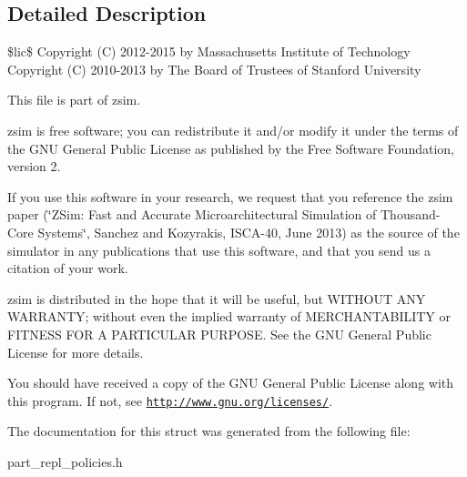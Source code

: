 \subsection{Detailed Description}
\$lic\$ Copyright (C) 2012-\/2015 by Massachusetts Institute of Technology Copyright (C) 2010-\/2013 by The Board of Trustees of Stanford University

This file is part of zsim.

zsim is free software; you can redistribute it and/or modify it under the terms of the G\-N\-U General Public License as published by the Free Software Foundation, version 2.

If you use this software in your research, we request that you reference the zsim paper (\char`\"{}\-Z\-Sim\-: Fast and Accurate Microarchitectural Simulation of
\-Thousand-\/\-Core Systems\char`\"{}, Sanchez and Kozyrakis, I\-S\-C\-A-\/40, June 2013) as the source of the simulator in any publications that use this software, and that you send us a citation of your work.

zsim is distributed in the hope that it will be useful, but W\-I\-T\-H\-O\-U\-T A\-N\-Y W\-A\-R\-R\-A\-N\-T\-Y; without even the implied warranty of M\-E\-R\-C\-H\-A\-N\-T\-A\-B\-I\-L\-I\-T\-Y or F\-I\-T\-N\-E\-S\-S F\-O\-R A P\-A\-R\-T\-I\-C\-U\-L\-A\-R P\-U\-R\-P\-O\-S\-E. See the G\-N\-U General Public License for more details.

You should have received a copy of the G\-N\-U General Public License along with this program. If not, see \href{http://www.gnu.org/licenses/}{\tt http\-://www.\-gnu.\-org/licenses/}. 

The documentation for this struct was generated from the following file\-:\begin{DoxyCompactItemize}
\item 
part\-\_\-repl\-\_\-policies.\-h\end{DoxyCompactItemize}
